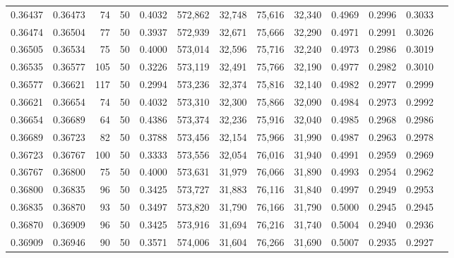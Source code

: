 \begin{tabular}{rrrrrrrrrrrrr}
0.36437 & 0.36473 &    74 &  50 &                                     0.4032 & 572,862 &  32,748 &  75,616 &  32,340 & 0.4969 & 0.2996 & 0.3033 \\
0.36474 & 0.36504 &    77 &  50 &                                     0.3937 & 572,939 &  32,671 &  75,666 &  32,290 & 0.4971 & 0.2991 & 0.3026 \\
0.36505 & 0.36534 &    75 &  50 &                                     0.4000 & 573,014 &  32,596 &  75,716 &  32,240 & 0.4973 & 0.2986 & 0.3019 \\
0.36535 & 0.36577 &   105 &  50 &                                     0.3226 & 573,119 &  32,491 &  75,766 &  32,190 & 0.4977 & 0.2982 & 0.3010 \\
0.36577 & 0.36621 &   117 &  50 &                                     0.2994 & 573,236 &  32,374 &  75,816 &  32,140 & 0.4982 & 0.2977 & 0.2999 \\
0.36621 & 0.36654 &    74 &  50 &                                     0.4032 & 573,310 &  32,300 &  75,866 &  32,090 & 0.4984 & 0.2973 & 0.2992 \\
0.36654 & 0.36689 &    64 &  50 &                                     0.4386 & 573,374 &  32,236 &  75,916 &  32,040 & 0.4985 & 0.2968 & 0.2986 \\
0.36689 & 0.36723 &    82 &  50 &                                     0.3788 & 573,456 &  32,154 &  75,966 &  31,990 & 0.4987 & 0.2963 & 0.2978 \\
0.36723 & 0.36767 &   100 &  50 &                                     0.3333 & 573,556 &  32,054 &  76,016 &  31,940 & 0.4991 & 0.2959 & 0.2969 \\
0.36767 & 0.36800 &    75 &  50 &                                     0.4000 & 573,631 &  31,979 &  76,066 &  31,890 & 0.4993 & 0.2954 & 0.2962 \\
0.36800 & 0.36835 &    96 &  50 &                                     0.3425 & 573,727 &  31,883 &  76,116 &  31,840 & 0.4997 & 0.2949 & 0.2953 \\
0.36835 & 0.36870 &    93 &  50 &                                     0.3497 & 573,820 &  31,790 &  76,166 &  31,790 & 0.5000 & 0.2945 & 0.2945 \\
0.36870 & 0.36909 &    96 &  50 &                                     0.3425 & 573,916 &  31,694 &  76,216 &  31,740 & 0.5004 & 0.2940 & 0.2936 \\
0.36909 & 0.36946 &    90 &  50 &                                     0.3571 & 574,006 &  31,604 &  76,266 &  31,690 & 0.5007 & 0.2935 & 0.2927 \\

\end{tabular}
